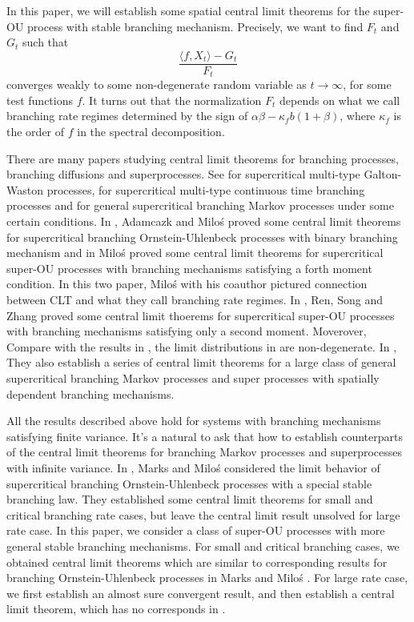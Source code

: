 \documentclass[12pt,a4paper]{amsart}
\theoremstyle{plain}
\theoremstyle{definition}
\numberwithin{equation}{section}
\begin{document}
 In this paper, we will establish some spatial central limit theorems for the super-OU process with stable branching mechanism. Precisely, we want to find $F_t$ and $G_t$ such that
 $$\frac{\langle f, X_t \rangle -G_t}{F_t}$$ converges weakly to some non-degenerate random variable as $t\rightarrow\infty$, for some test functions $f$. It turns out that the normalization $F_t$ depends on what we call branching rate regimes determined by the sign of $\alpha\beta-\kappa_f b (1+\beta)$, where $\kappa_f$ is the order of $f$ in the spectral decomposition.

 There are many papers studying central limit theorems for branching processes, branching diffusions and superprocesses. See \cite{HKBPS1,HKBPS2} for supercritical multi-type Galton-Waston processes, \cite{KBA1,KBA2,KBA3} for supercritical multi-type continuous time branching processes and \cite{ASHH} for general supercritical branching Markov processes under some certain conditions. In \cite{ARMP}, Adamcazk and Milo\'s proved some central limit theorems for supercritical branching Ornstein-Uhlenbeck processes with binary branching mechanism and in \cite{MP2012} Milo\'s proved some central limit theorems for supercritical super-OU processes with branching mechanisms satisfying a forth moment condition. In this two paper, Milo\'s with his coauthor pictured connection between CLT and what they call branching rate regimes. In \cite{RSZ}, Ren, Song and Zhang proved some central limit thoerems for supercritical super-OU processes with branching mechanisms satisfying only a second moment. Moverover, Compare with the results in \cite{ARMP,MP2012}, the limit distributions in \cite{RSZ} are non-degenerate. In \cite{RSZ1,RSZ2,RSZ3,RSZ4}, They also establish a series of central limit theorems for a large class of general supercritical branching Markov processes and super processes with spatially dependent branching mechanisms.

 All the results described above hold for systems with branching mechanisms satisfying finite variance. It's a natural  to ask that how to establish counterparts of the central limit theorems for branching Markov processes and superprocesses with infinite variance.  In \cite{MM}, Marks and Milo\'s considered the limit behavior of supercritical branching Ornstein-Uhlenbeck processes with a special stable branching law. They established some central limit theorems for small and critical branching rate cases,  but leave the central limit result unsolved for large rate case. In this paper, we consider a class of super-OU processes with more general stable branching mechanisms. For small and critical branching cases, we obtained central limit theorems which are similar to corresponding results for branching Ornstein-Uhlenbeck processes in Marks and Milo\'s \cite{MM}. For large rate case, we first establish  an almost sure convergent result, and then establish a central limit theorem, which has no corresponds in \cite{MM}.
\end{document}
